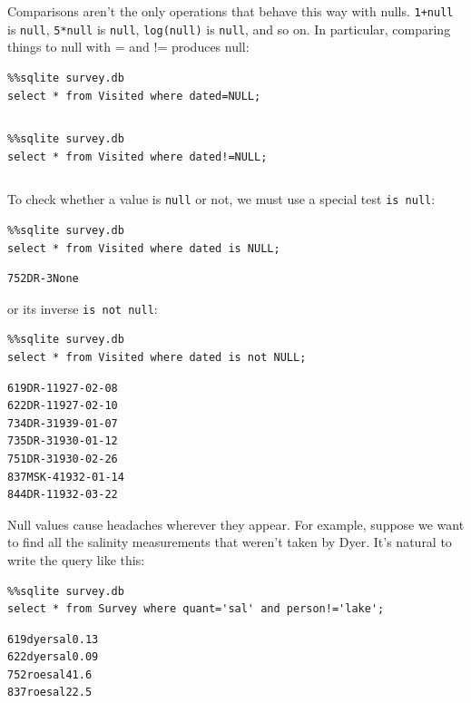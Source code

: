 \documentclass{book}
\begin{document}
Comparisons aren't the only operations that behave this way with nulls.
\texttt{1+null} is \texttt{null}, \texttt{5*null} is \texttt{null},
\texttt{log(null)} is \texttt{null}, and so on. In particular, comparing
things to null with = and != produces null:

\begin{verbatim}
%%sqlite survey.db
select * from Visited where dated=NULL;
\end{verbatim}

\begin{verbatim}
\end{verbatim}

\begin{verbatim}
%%sqlite survey.db
select * from Visited where dated!=NULL;
\end{verbatim}

\begin{verbatim}
\end{verbatim}

To check whether a value is \texttt{null} or not, we must use a special
test \texttt{is null}:

\begin{verbatim}
%%sqlite survey.db
select * from Visited where dated is NULL;
\end{verbatim}

\begin{verbatim}
752DR-3None
\end{verbatim}

or its inverse \texttt{is not null}:

\begin{verbatim}
%%sqlite survey.db
select * from Visited where dated is not NULL;
\end{verbatim}

\begin{verbatim}
619DR-11927-02-08
622DR-11927-02-10
734DR-31939-01-07
735DR-31930-01-12
751DR-31930-02-26
837MSK-41932-01-14
844DR-11932-03-22
\end{verbatim}

Null values cause headaches wherever they appear. For example, suppose
we want to find all the salinity measurements that weren't taken by
Dyer. It's natural to write the query like this:

\begin{verbatim}
%%sqlite survey.db
select * from Survey where quant='sal' and person!='lake';
\end{verbatim}

\begin{verbatim}
619dyersal0.13
622dyersal0.09
752roesal41.6
837roesal22.5
\end{verbatim}
\end{document}

